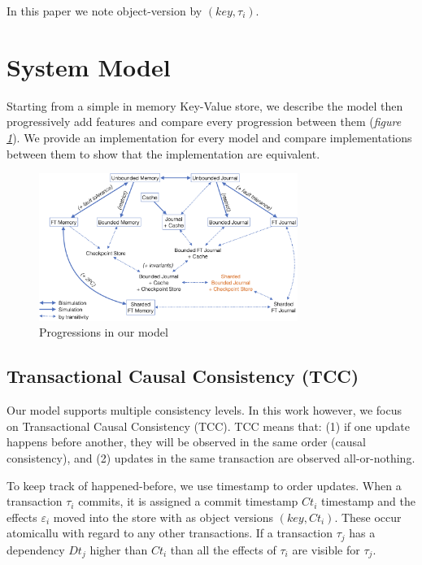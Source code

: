 \documentclass[systeme]{compas2022}
\begin{document}
In this paper we note object-version by $(key ,\tau_i)$.

\section{System Model}

Starting from a simple in memory Key-Value store, we describe the model then progressively add features and compare every progression between them (\emph{figure \ref{fig:transitions}}).
We provide an implementation for every model and compare implementations between them to show that the implementation are equivalent.

\begin{figure}[tp]
  \centering
  \includegraphics[width=0.75\textwidth]{figures/transitions.png}
  \caption{Progressions in our model}
  \label{fig:transitions}
\end{figure}

\subsection{Transactional Causal Consistency (TCC)}

Our model supports multiple consistency levels. In this work however, we focus on Transactional Causal Consistency (TCC).
TCC means that: (1) if one update happens before another, they will be observed in the same order (causal consistency), and (2) updates in the same transaction are observed all-or-nothing.

To keep track of happened-before, we use timestamp to order updates.
When a transaction $\tau_i$ commits, it is assigned a commit timestamp $Ct_i$ timestamp and the effects $\varepsilon_i$ moved into the store with as object versions $(key,Ct_i)$.
These occur atomicallu with regard to any other transactions.
If a transaction $\tau_j$ has a dependency $Dt_j$ higher than $Ct_i$ than all the effects of $\tau_i$ are visible for $\tau_j$.
\end{document}

